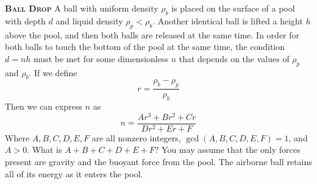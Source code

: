 \begin{problem}
{\textbf{\textsc{Ball Drop}}} A ball with uniform density $\rho_b$ is placed on the surface of a pool with depth $d$ and liquid density $\rho_p < \rho_b$. Another identical ball is lifted a height $h$ above the pool, and then both balls are released at the same time. In order for both balls to touch the bottom of the pool at the same time, the condition $d = nh$ must be met for some dimensionless $n$ that depends on the values of $\rho_p$ and $\rho_b$. If we define
$$r = \frac{\rho_b - \rho_p}{\rho_b}$$
Then we can express $n$ as
$$n = \frac{Ar^3 + Br^2 + Cr}{Dr^2+Er+F}$$
Where $A, B, C, D, E, F$ are all nonzero integers, $\gcd(A,B,C,D,E,F) = 1$, and $A>0$. What is $A + B + C + D + E + F$?
You may assume that the only forces present are gravity and the buoyant force from the pool. The airborne ball retains all of its energy as it enters the pool.
\end{problem}